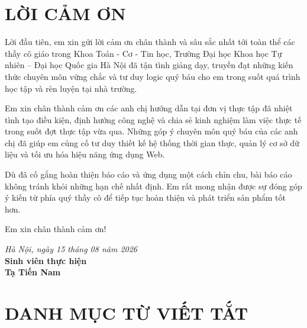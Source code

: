 \documentclass[12pt,a4paper]{extarticle}
\begin{document}
\newpage
\section*{LỜI CẢM ƠN}

Lời đầu tiên, em xin gửi lời cảm ơn chân thành và sâu sắc nhất tới toàn thể các thầy cô giáo trong Khoa Toán - Cơ - Tin học, Trường Đại học Khoa học Tự nhiên – Đại học Quốc gia Hà Nội đã tận tình giảng dạy, truyền đạt những kiến thức chuyên môn vững chắc và tư duy logic quý báu cho em trong suốt quá trình học tập và rèn luyện tại nhà trường.

Em xin chân thành cảm ơn các anh chị hướng dẫn tại đơn vị thực tập đã nhiệt tình tạo điều kiện, định hướng công nghệ và chia sẻ kinh nghiệm làm việc thực tế trong suốt đợt thực tập vừa qua. Những góp ý chuyên môn quý báu của các anh chị đã giúp em củng cố tư duy thiết kế hệ thống thời gian thực, quản lý cơ sở dữ liệu và tối ưu hóa hiệu năng ứng dụng Web.

Dù đã cố gắng hoàn thiện báo cáo và ứng dụng một cách chỉn chu, bài báo cáo không tránh khỏi những hạn chế nhất định. Em rất mong nhận được sự đóng góp ý kiến từ phía quý thầy cô để tiếp tục hoàn thiện và phát triển sản phẩm tốt hơn.

Em xin chân thành cảm ơn!

\vspace{1cm}
\begin{flushright}
    \textit{Hà Nội, ngày 15 tháng 08 năm 2026}\\
    \textbf{Sinh viên thực hiện}\\
    \vspace{1.5cm}
    \textbf{Tạ Tiến Nam}
\end{flushright}

\newpage
\section*{DANH MỤC TỪ VIẾT TẮT}
\end{document}

